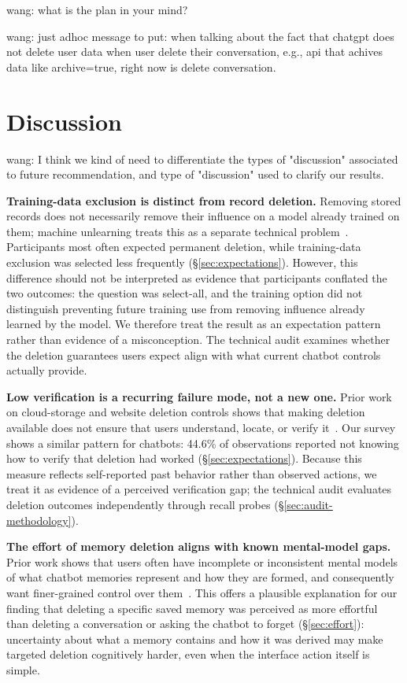 \documentclass[conference,compsoc]{IEEEtran}
\newcommand{\xw}[1] {{\color{red}wang: #1}}
\begin{document}
\xw{what is the plan in your mind?}

\xw{just adhoc message to put: when talking about the fact that chatgpt does not delete user data when user delete their conversation, e.g., api that achives data like archive=true, right now is delete conversation.}

\section{Discussion}
\label{sec:discussion}

\xw{I think we kind of need to differentiate the types of "discussion" associated to future recommendation, and type of "discussion" used to clarify our results.}

\textbf{Training-data exclusion is distinct from record deletion.} Removing stored records does not necessarily remove their influence on a model already trained on them; machine unlearning treats this as a separate technical problem~\cite{bourtoule2021machine}. Participants most often expected permanent deletion, while training-data exclusion was selected less frequently (\S\ref{sec:expectations}). However, this difference should not be interpreted as evidence that participants conflated the two outcomes: the question was select-all, and the training option did not distinguish preventing future training use from removing influence already learned by the model. We therefore treat the result as an expectation pattern rather than evidence of a misconception. The technical audit examines whether the deletion guarantees users expect align with what current chatbot controls actually provide.

\textbf{Low verification is a recurring failure mode, not a new one.} Prior work on cloud-storage and website deletion controls shows that making deletion available does not ensure that users understand, locate, or verify it~\cite{ramokapane2017stupid,habib2019empirical}. Our survey shows a similar pattern for chatbots: 44.6\% of observations reported not knowing how to verify that deletion had worked (\S\ref{sec:expectations}). Because this measure reflects self-reported past behavior rather than observed actions, we treat it as evidence of a perceived verification gap; the technical audit evaluates deletion outcomes independently through recall probes (\S\ref{sec:audit-methodology}).

\textbf{The effort of memory deletion aligns with known mental-model gaps.} Prior work shows that users often have incomplete or inconsistent mental models of what chatbot memories represent and how they are formed, and consequently want finer-grained control over them~\cite{zhang2025understanding}. This offers a plausible explanation for our finding that deleting a specific saved memory was perceived as more effortful than deleting a conversation or asking the chatbot to forget (\S\ref{sec:effort}): uncertainty about what a memory contains and how it was derived may make targeted deletion cognitively harder, even when the interface action itself is simple.
\end{document}
